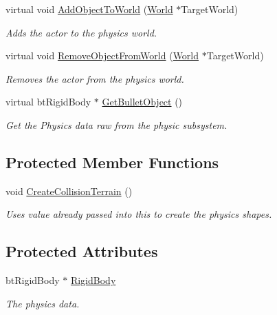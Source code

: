 \begin{DoxyCompactItemize}
virtual void \hyperlink{classphys_1_1ActorTerrain_a890ee6f67fda30381bce9c949ae36566}{AddObjectToWorld} (\hyperlink{classphys_1_1World}{World} $\ast$TargetWorld)
\begin{DoxyCompactList}\small\item\em Adds the actor to the physics world. \item\end{DoxyCompactList}\item 
virtual void \hyperlink{classphys_1_1ActorTerrain_aeded1fdabfc4dd407f81fcc5b97c1f77}{RemoveObjectFromWorld} (\hyperlink{classphys_1_1World}{World} $\ast$TargetWorld)
\begin{DoxyCompactList}\small\item\em Removes the actor from the physics world. \item\end{DoxyCompactList}\item 
virtual btRigidBody $\ast$ \hyperlink{classphys_1_1ActorTerrain_a1bed32f1b9afd1bd28c231b7505c267e}{GetBulletObject} ()
\begin{DoxyCompactList}\small\item\em Get the Physics data raw from the physic subsystem. \item\end{DoxyCompactList}\end{DoxyCompactItemize}
\subsection*{Protected Member Functions}
\begin{DoxyCompactItemize}
\item 
\hypertarget{classphys_1_1ActorTerrain_ade758919c0f2b58ad1fe4bfd388d79af}{
void \hyperlink{classphys_1_1ActorTerrain_ade758919c0f2b58ad1fe4bfd388d79af}{CreateCollisionTerrain} ()}
\label{de/d74/classphys_1_1ActorTerrain_ade758919c0f2b58ad1fe4bfd388d79af}

\begin{DoxyCompactList}\small\item\em Uses value already passed into this to create the physics shapes. \item\end{DoxyCompactList}\end{DoxyCompactItemize}
\subsection*{Protected Attributes}
\begin{DoxyCompactItemize}
\item 
btRigidBody $\ast$ \hyperlink{classphys_1_1ActorTerrain_a86b22aad61a7ffceb5c757ddcbca48c3}{RigidBody}
\begin{DoxyCompactList}\small\item\em The physics data. \item\end{DoxyCompactList}\end{DoxyCompactItemize}


